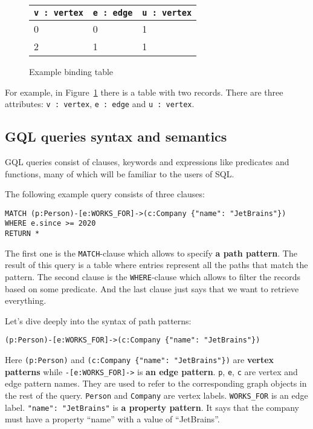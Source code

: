 \documentclass[14pt]{constructor-thesis}
\begin{document}
\begin{figure}
  \centering
  
  \begin{tabular}{ |p{3cm}|p{3cm}|p{3cm}|  }
    \hline
    \texttt{v : vertex} & \texttt{e : edge} & \texttt{u : vertex} \\
    \hline
    0 & 0 & 1 \\
    2 & 1 & 1 \\
    \hline
  \end{tabular}

  \caption{Example binding table}
  \label{fig:example-binding-table}
\end{figure}

For example, in Figure~\ref{fig:example-binding-table} there is a table with two records. There are three attributes: \texttt{v : vertex}, \texttt{e : edge} and \texttt{u : vertex}. 


\subsection{GQL queries syntax and semantics}

GQL queries consist of clauses, keywords and expressions like predicates and functions, many of which will be familiar to the users of SQL.


The following example query consists of three clauses:
\begin{verbatim}
MATCH (p:Person)-[e:WORKS_FOR]->(c:Company {"name": "JetBrains"})
WHERE e.since >= 2020
RETURN *
\end{verbatim}

The first one is the \texttt{MATCH}-clause which allows to specify \textbf{a path pattern}. The result of this query is a table where entries represent all the paths that match the pattern. The second clause is the \texttt{WHERE}-clause which allows to filter the records based on some predicate. And the last clause just says that we want to retrieve everything.

Let's dive deeply into the syntax of path patterns:
\begin{verbatim}
(p:Person)-[e:WORKS_FOR]->(c:Company {"name": "JetBrains"})
\end{verbatim}

Here \verb+(p:Person)+ and \verb+(c:Company {"name": "JetBrains"})+ are \textbf{vertex patterns} while \verb+-[e:WORKS_FOR]->+ is \textbf{an edge pattern}. \texttt{p}, \texttt{e}, \texttt{c} are vertex and edge pattern names. They are used to refer to the corresponding graph objects in the rest of the query. \texttt{Person} and \texttt{Company} are vertex labels. \texttt{WORKS\_FOR} is an edge label. \texttt{"name": "JetBrains"} is \textbf{a property pattern}. It says that the company must have a property ``name'' with a value of ``JetBrains''.
\end{document}
